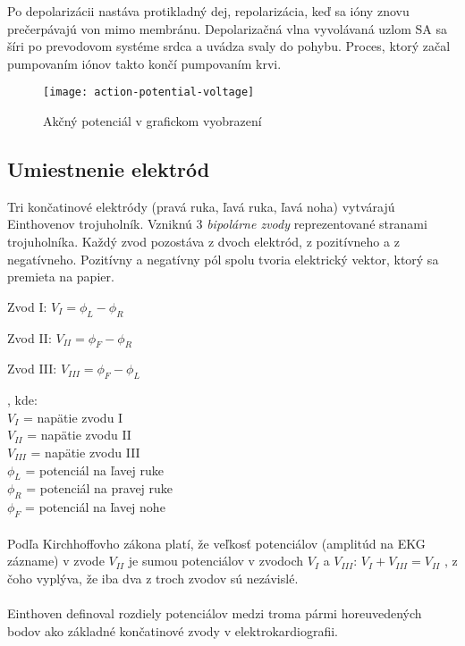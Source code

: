 \documentclass[titlepage]{article}
\begin{document}
Po depolarizácii nastáva protikladný dej, repolarizácia, keď sa ióny znovu prečerpávajú von mimo membránu. Depolarizačná vlna vyvolávaná uzlom SA sa šíri po prevodovom systéme srdca a uvádza svaly do pohybu. Proces, ktorý začal pumpovaním iónov takto končí pumpovaním krvi. 

\begin{figure}[!ht]
\begin{center}
\texttt{[image: action-potential-voltage]}
\caption{Akčný potenciál v grafickom vyobrazení}
\end{center}
\end{figure}


\newpage
\subsection{Umiestnenie elektród}
Tri končatinové elektródy (pravá ruka, ľavá ruka, ľavá noha)  vytvárajú Einthovenov trojuholník. Vzniknú 3 \emph{bipolárne zvody} reprezentované stranami trojuholníka. Každý zvod pozostáva z dvoch elektród, z pozitívneho a z negatívneho. Pozitívny a negatívny pól spolu tvoria elektrický vektor, ktorý sa premieta na papier.

\begin{description}
	\item Zvod I: \tabto{1cm} $V_{I} = \phi_L - \phi_R$
	\item Zvod II: \tabto{1cm} $V_{II} = \phi_F - \phi_R$
	\item Zvod III:	\tabto{1cm} $V_{III} = \phi_F - \phi_L$
\end{description}
, kde: \\
\tabto{1cm} $V_{I}$ = napätie zvodu I\\
\tabto{1cm} $V_{II}$ = napätie zvodu II\\
\tabto{1cm} $V_{III}$ = napätie zvodu III\\
\tabto{1cm} $\phi_L$ = potenciál na ľavej ruke\\
\tabto{1cm} $\phi_R$ = potenciál na pravej ruke\\
\tabto{1cm} $\phi_F$ = potenciál na ľavej nohe\\
\\
Podľa Kirchhoffovho zákona platí, že veľkosť potenciálov (amplitúd na EKG zázname) v zvode $V_{II}$ je sumou potenciálov v zvodoch $V_{I}$ a  $V_{III}$:
\tabto{1cm} $V_{I} + V_{III} = V_{II}$
, z čoho vyplýva, že iba dva z troch zvodov sú nezávislé.
\\
\\
Einthoven definoval rozdiely potenciálov medzi troma pármi horeuvedených bodov ako základné končatinové zvody v elektrokardiografii.
\end{document}
